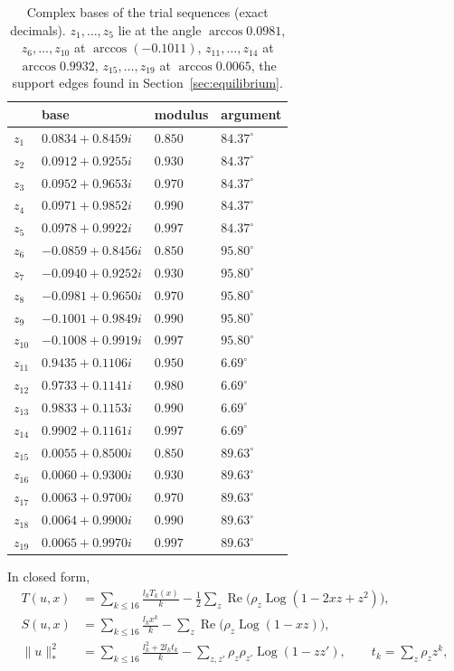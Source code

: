 \documentclass[11pt]{article}
\theoremstyle{definition}
\begin{document}
\begin{table}[ht]
\centering
\small
\begin{tabular}{llll}
\toprule
 & base & modulus & argument\\
\midrule
$z_{1}$ & $0.0834+0.8459i$ & $0.850$ & $84.37^\circ$\\
$z_{2}$ & $0.0912+0.9255i$ & $0.930$ & $84.37^\circ$\\
$z_{3}$ & $0.0952+0.9653i$ & $0.970$ & $84.37^\circ$\\
$z_{4}$ & $0.0971+0.9852i$ & $0.990$ & $84.37^\circ$\\
$z_{5}$ & $0.0978+0.9922i$ & $0.997$ & $84.37^\circ$\\
$z_{6}$ & $-0.0859+0.8456i$ & $0.850$ & $95.80^\circ$\\
$z_{7}$ & $-0.0940+0.9252i$ & $0.930$ & $95.80^\circ$\\
$z_{8}$ & $-0.0981+0.9650i$ & $0.970$ & $95.80^\circ$\\
$z_{9}$ & $-0.1001+0.9849i$ & $0.990$ & $95.80^\circ$\\
$z_{10}$ & $-0.1008+0.9919i$ & $0.997$ & $95.80^\circ$\\
$z_{11}$ & $0.9435+0.1106i$ & $0.950$ & $6.69^\circ$\\
$z_{12}$ & $0.9733+0.1141i$ & $0.980$ & $6.69^\circ$\\
$z_{13}$ & $0.9833+0.1153i$ & $0.990$ & $6.69^\circ$\\
$z_{14}$ & $0.9902+0.1161i$ & $0.997$ & $6.69^\circ$\\
$z_{15}$ & $0.0055+0.8500i$ & $0.850$ & $89.63^\circ$\\
$z_{16}$ & $0.0060+0.9300i$ & $0.930$ & $89.63^\circ$\\
$z_{17}$ & $0.0063+0.9700i$ & $0.970$ & $89.63^\circ$\\
$z_{18}$ & $0.0064+0.9900i$ & $0.990$ & $89.63^\circ$\\
$z_{19}$ & $0.0065+0.9970i$ & $0.997$ & $89.63^\circ$\\
\bottomrule
\end{tabular}
\caption{Complex bases of the trial sequences (exact decimals). $z_1,\dots,z_5$ lie at the angle $\arccos0.0981$, $z_6,\dots,z_{10}$ at $\arccos(-0.1011)$, $z_{11},\dots,z_{14}$ at $\arccos0.9932$, $z_{15},\dots,z_{19}$ at $\arccos0.0065$, the support edges found in Section~\ref{sec:equilibrium}.}\label{tab:bases}
\end{table} In closed form,
\begin{align*}
T(u,x)&=\sum_{k\le16}\frac{l_kT_k(x)}{k}-\frac12\sum_z\operatorname{Re}\big(\rho_z\operatorname{Log}(1-2xz+z^2)\big),\\
S(u,x)&=\sum_{k\le16}\frac{l_kx^k}{k}-\sum_z\operatorname{Re}\big(\rho_z\operatorname{Log}(1-xz)\big),\\
\|u\|_*^2&=\sum_{k\le16}\frac{l_k^2+2l_kt_k}{k}-\sum_{z,z'}\rho_z\rho_{z'}\operatorname{Log}(1-zz'),\qquad t_k=\sum_z\rho_zz^k,
\end{align*}
\end{document}
